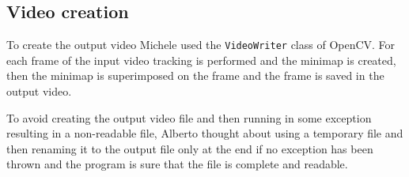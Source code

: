 \subsection{Video creation}
To create the output video Michele used the \texttt{VideoWriter} class of OpenCV.
For each frame of the input video tracking is performed and the minimap is created, then the minimap is superimposed on the frame and the frame is saved in the output video.

To avoid creating the output video file and then running in some exception resulting in a non-readable file, Alberto thought about using a temporary file and then renaming it to the output file only at the end if no exception has been thrown and the program is sure that the file is complete and readable.

